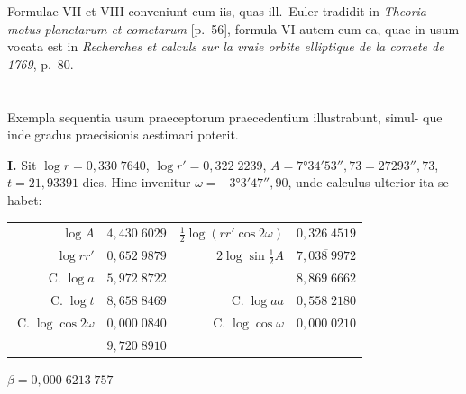 \documentclass[12pt,a4paper]{article}
\newcommand{\C}{\mathop{\mathrm{C.}}\nolimits}
\begin{document}
Formulae VII et VIII conveniunt cum iis, quas ill.~Euler tradidit in \textit{Theoria
motus planetarum et cometarum} [p.~56], formula VI autem cum ea, quae in usum
vocata est in \textit{Recherches et calculs sur la vraie orbite elliptique de la comete de
1769}, p.~80.

\section{}

Exempla sequentia usum praeceptorum praecedentium illustrabunt, simul-
que inde gradus praecisionis aestimari poterit.

\textbf{I.} Sit $\log r = 0{,}330\;7640$, $\log r' = 0{,}322\;2239$, $A = 7°34'53'',73 = 27293'',73$,
$t = 21{,}93391$ dies. Hinc invenitur $\omega = -3°3'47'',90$, unde calculus ulterior ita
se habet:

\begin{center}
\begin{tabular}{@{}r@{\quad}l@{\qquad}r@{\quad}l@{}}
$\log A$ & $4{,}430\;6029$ & $\tfrac{1}{2}\log(rr'\cos 2\omega)$ & $0{,}326\;4519$ \\
$\log rr'$ & $0{,}652\;9879$ & $2\log\sin\tfrac{1}{2}A$ & $\overline{7{,}038\;9972}$ \\
$\C\log a$ & $5{,}972\;8722$ & & $8{,}869\;6662$ \\
$\C\log t$ & $8{,}658\;8469$ & $\C\log aa$ & $0{,}558\;2180$ \\
$\C\log\cos 2\omega$ & $0{,}000\;0840$ & $\C\log\cos\omega$ & $0{,}000\;0210$ \\ \hline
& $9{,}720\;8910$ & & \vphantom{$9{,}793\;3543$}
\end{tabular}
\end{center}

\begin{center}
$\beta = 0{,}000\;6213\;757$
\end{center}
\end{document}
